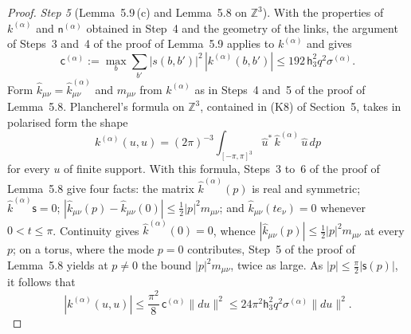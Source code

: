 \documentclass[11pt,letterpaper,reqno]{amsart}
\theoremstyle{definition}
\begin{document}
\begin{proof}
\emph{Step 5} (Lemma~5.9\,(c) and Lemma~5.8 on $\mathbb Z^3$).
With the properties of $k^{(\alpha)}$ and $\mathsf n^{(\alpha)}$ obtained in Step~4 and the geometry of the links, the argument of Steps~3 and~4 of the proof of Lemma~5.9 applies to $k^{(\alpha)}$ and gives
\begin{equation*}
\mathsf c^{(\alpha)}:=\max_b\sum_{b'}|s(b,b')|^2\,|k^{(\alpha)}(b,b')|\le192\,\mathsf h_3^2q^2\sigma^{(\alpha)}.
\end{equation*}
Form $\hat k_{\mu\nu}=\hat k^{(\alpha)}_{\mu\nu}$ and $m_{\mu\nu}$ from $k^{(\alpha)}$ as in Steps~4 and~5 of the proof of Lemma~5.8.
Plancherel's formula on $\mathbb Z^3$, contained in (K8) of Section~5, takes in polarised form the shape
\begin{equation*}
k^{(\alpha)}(u,u)=(2\pi)^{-3}\int_{[-\pi,\pi]^3}\hat u^*\,\hat k^{(\alpha)}\,\hat u\,dp
\end{equation*}
for every $u$ of finite support.
With this formula, Steps~3 to~6 of the proof of Lemma~5.8 give four facts:
the matrix $\hat k^{(\alpha)}(p)$ is real and symmetric;
$\hat k^{(\alpha)}\mathsf s=0$;
$|\hat k_{\mu\nu}(p)-\hat k_{\mu\nu}(0)|\le\frac12|p|^2m_{\mu\nu}$;
and $\hat k_{\mu\nu}(te_\nu)=0$ whenever $0<t\le\pi$.
Continuity gives $\hat k^{(\alpha)}(0)=0$, whence $|\hat k_{\mu\nu}(p)|\le\frac12|p|^2m_{\mu\nu}$ at every $p$;
on a torus, where the mode $p=0$ contributes, Step~5 of the proof of Lemma~5.8 yields at $p\ne0$ the bound $|p|^2m_{\mu\nu}$, twice as large.
As $|p|\le\frac\pi2|\mathsf s(p)|$, it follows that
\begin{equation*}
|k^{(\alpha)}(u,u)|\le\frac{\pi^2}{8}\,\mathsf c^{(\alpha)}\|du\|^2\le24\pi^2\mathsf h_3^2q^2\sigma^{(\alpha)}\|du\|^2.
\end{equation*}


\end{proof}
\end{document}
